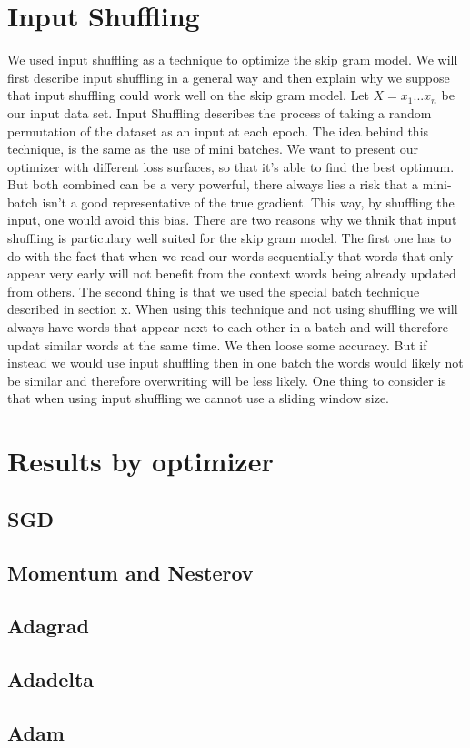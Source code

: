 \section{Input Shuffling}
We used input shuffling as a technique to optimize the skip gram model. We will first describe input shuffling in a general way and then explain why we suppose that input shuffling could work well on the skip gram model. 
Let $X = {x_1...x_n}$ be our input data set. Input Shuffling describes the process of taking a random permutation of the dataset as an input at each epoch. 
The idea behind this technique, is the same as the use of mini batches. We want to present our optimizer with different loss surfaces, so that it's able to find the best optimum. But both combined can be a very powerful, there always lies a risk that a mini-batch isn't a good representative of the true gradient. This way, by shuffling the input, one would avoid this bias.
There are two reasons why we thnik that input shuffling is particulary well suited for the skip gram model. The first one has to do with the fact that when we read our words sequentially that words that only appear very early will not benefit from the context words being already updated from others. The second thing is that we used the special batch technique described in section x.  When using this technique and not using shuffling we will always have words that appear next to each other in a batch and will therefore updat similar words at the same time. We then loose some accuracy. But if instead we would use input shuffling then in one batch the words would likely not be similar and therefore overwriting will be less likely. 
One thing to consider is that when using input shuffling we cannot use a sliding window size. 

\section{Results by optimizer}
\subsection{SGD}

\subsection{Momentum and Nesterov}
\subsection{Adagrad}
\subsection{Adadelta}
\subsection{Adam}